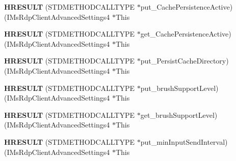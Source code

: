 \begin{DoxyCompactItemize}
\item 
\mbox{\label{struct_i_ms_rdp_client_advanced_settings4_vtbl_a337df11c4362613dc371268039892f71}} 
{\bfseries H\+R\+E\+S\+U\+LT} (S\+T\+D\+M\+E\+T\+H\+O\+D\+C\+A\+L\+L\+T\+Y\+PE $\ast$put\+\_\+\+Cache\+Persistence\+Active)(I\+Ms\+Rdp\+Client\+Advanced\+Settings4 $\ast$This
\item 
\mbox{\label{struct_i_ms_rdp_client_advanced_settings4_vtbl_ad709b83484df7f08f5c046dc371aa376}} 
{\bfseries H\+R\+E\+S\+U\+LT} (S\+T\+D\+M\+E\+T\+H\+O\+D\+C\+A\+L\+L\+T\+Y\+PE $\ast$get\+\_\+\+Cache\+Persistence\+Active)(I\+Ms\+Rdp\+Client\+Advanced\+Settings4 $\ast$This
\item 
\mbox{\label{struct_i_ms_rdp_client_advanced_settings4_vtbl_ad25eae0fa974b3efc9f5174043775a79}} 
{\bfseries H\+R\+E\+S\+U\+LT} (S\+T\+D\+M\+E\+T\+H\+O\+D\+C\+A\+L\+L\+T\+Y\+PE $\ast$put\+\_\+\+Persist\+Cache\+Directory)(I\+Ms\+Rdp\+Client\+Advanced\+Settings4 $\ast$This
\item 
\mbox{\label{struct_i_ms_rdp_client_advanced_settings4_vtbl_ab4d1f89d3300b5df303ce4a05923604d}} 
{\bfseries H\+R\+E\+S\+U\+LT} (S\+T\+D\+M\+E\+T\+H\+O\+D\+C\+A\+L\+L\+T\+Y\+PE $\ast$put\+\_\+brush\+Support\+Level)(I\+Ms\+Rdp\+Client\+Advanced\+Settings4 $\ast$This
\item 
\mbox{\label{struct_i_ms_rdp_client_advanced_settings4_vtbl_a9fb7a44eccc282017e6b4f2dd76501dc}} 
{\bfseries H\+R\+E\+S\+U\+LT} (S\+T\+D\+M\+E\+T\+H\+O\+D\+C\+A\+L\+L\+T\+Y\+PE $\ast$get\+\_\+brush\+Support\+Level)(I\+Ms\+Rdp\+Client\+Advanced\+Settings4 $\ast$This
\item 
\mbox{\label{struct_i_ms_rdp_client_advanced_settings4_vtbl_aed1ceefed72c930e932f6bd02fc58d61}} 
{\bfseries H\+R\+E\+S\+U\+LT} (S\+T\+D\+M\+E\+T\+H\+O\+D\+C\+A\+L\+L\+T\+Y\+PE $\ast$put\+\_\+min\+Input\+Send\+Interval)(I\+Ms\+Rdp\+Client\+Advanced\+Settings4 $\ast$This
\item 
\mbox{\label{struct_i_ms_rdp_client_advanced_settings4_vtbl_aabcac214aceada6cd5f818befd15a90c}} 

\end{DoxyCompactItemize}
